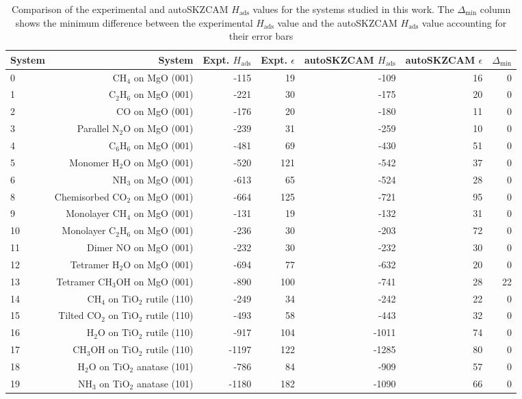 \begin{table}
\caption{\label{tab:hads_comparison}Comparison of the experimental and autoSKZCAM $H_\textrm{ads}$ values for the systems studied in this work. The $\Delta_\textrm{min}$ column shows the minimum difference between the experimental $H_\textrm{ads}$ value and the autoSKZCAM $H_\textrm{ads}$ value accounting for their error bars}
\begin{adjustbox}{center,max width=0.9\textwidth}
\begin{tabular}{lrrrrrr}
\toprule
System & System & Expt. $H_\textrm{ads}$ & Expt. $\epsilon$ & autoSKZCAM $H_\textrm{ads}$ & autoSKZCAM $\epsilon$ & $\Delta_\textrm{min}$ \\ 
\midrule
0 & CH$_4$ on MgO (001) & -115 & 19 & -109 & 16 & 0 \\
1 & C$_2$H$_6$ on MgO (001) & -221 & 30 & -175 & 20 & 0 \\
2 & CO on MgO (001) & -176 & 20 & -180 & 11 & 0 \\
3 & Parallel N$_2$O on MgO (001) & -239 & 31 & -259 & 10 & 0 \\
4 & C$_6$H$_6$ on MgO (001) & -481 & 69 & -430 & 51 & 0 \\
5 & Monomer H$_2$O on MgO (001) & -520 & 121 & -542 & 37 & 0 \\
6 & NH$_3$ on MgO (001) & -613 & 65 & -524 & 28 & 0 \\
8 & Chemisorbed CO$_2$ on MgO (001) & -664 & 125 & -721 & 95 & 0 \\
9 & Monolayer CH$_4$ on MgO (001) & -131 & 19 & -132 & 31 & 0 \\
10 & Monolayer C$_2$H$_6$ on MgO (001) & -236 & 30 & -203 & 72 & 0 \\
11 & Dimer NO on MgO (001) & -232 & 30 & -232 & 30 & 0 \\
12 & Tetramer H$_2$O on MgO (001) & -694 & 77 & -632 & 20 & 0 \\
13 & Tetramer CH$_3$OH on MgO (001) & -890 & 100 & -741 & 28 & 22 \\
14 & CH$_4$ on TiO$_2$ rutile (110) & -249 & 34 & -242 & 22 & 0 \\
15 & Tilted CO$_2$ on TiO$_2$ rutile (110) & -493 & 58 & -443 & 32 & 0 \\
16 & H$_2$O on TiO$_2$ rutile (110) & -917 & 104 & -1011 & 74 & 0 \\
17 & CH$_3$OH on TiO$_2$ rutile (110) & -1197 & 122 & -1285 & 80 & 0 \\
18 & H$_2$O on TiO$_2$ anatase (101) & -786 & 84 & -909 & 57 & 0 \\
19 & NH$_3$ on TiO$_2$ anatase (101) & -1180 & 182 & -1090 & 66 & 0 \\
\bottomrule
\end{tabular}
\end{adjustbox}
\end{table}